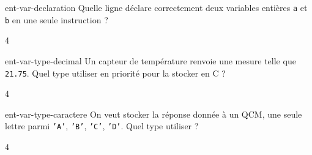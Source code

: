 
\begin{question}{ent-var-declaration}
    Quelle ligne déclare correctement deux variables entières \texttt{a} et \texttt{b} en une seule instruction ?
    \begin{multicols}{4}
        \begin{reponses}
        \end{reponses}
    \end{multicols}
\end{question}

\begin{question}{ent-var-type-decimal}
    Un capteur de température renvoie une mesure telle que \texttt{21.75}. Quel type utiliser en priorité pour la stocker en C ?
    \begin{multicols}{4}
        \begin{reponses}
        \end{reponses}
    \end{multicols}
\end{question}

\begin{question}{ent-var-type-caractere}
    On veut stocker la réponse donnée à un QCM, une seule lettre parmi \texttt{'A'}, \texttt{'B'}, \texttt{'C'}, \texttt{'D'}. Quel type utiliser ?
    \begin{multicols}{4}
        \begin{reponses}
        \end{reponses}
    \end{multicols}
\end{question}

